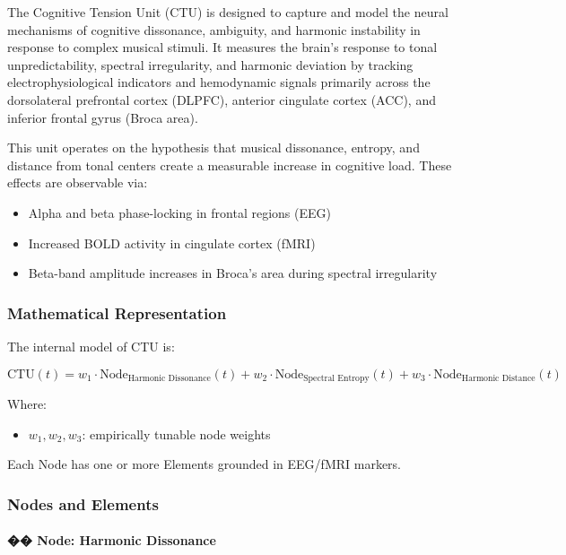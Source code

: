 \documentclass[10pt]{article}
\begin{document}
The Cognitive Tension Unit (CTU) is designed to capture and model the neural mechanisms of cognitive dissonance, ambiguity, and harmonic instability in response to complex musical stimuli. It measures the brain’s response to tonal unpredictability, spectral irregularity, and harmonic deviation by tracking electrophysiological indicators and hemodynamic signals primarily across the dorsolateral prefrontal cortex (DLPFC), anterior cingulate cortex (ACC), and inferior frontal gyrus (Broca area).

This unit operates on the hypothesis that musical dissonance, entropy, and distance from tonal centers create a measurable increase in cognitive load. These effects are observable via:

\begin{itemize}
    \item Alpha and beta phase-locking in frontal regions (EEG)
    \item Increased BOLD activity in cingulate cortex (fMRI)
    \item Beta-band amplitude increases in Broca’s area during spectral irregularity
\end{itemize}

\subsubsection*{Mathematical Representation}

The internal model of CTU is:

\[
\text{CTU}(t) = w_1 \cdot \text{Node}_{\text{Harmonic Dissonance}}(t) + w_2 \cdot \text{Node}_{\text{Spectral Entropy}}(t) + w_3 \cdot \text{Node}_{\text{Harmonic Distance}}(t)
\]

Where:

\begin{itemize}
    \item $w_1, w_2, w_3$: empirically tunable node weights
\end{itemize}

Each Node has one or more Elements grounded in EEG/fMRI markers.

\subsubsection*{Nodes and Elements}

\paragraph{�� Node: Harmonic Dissonance}
\end{document}

